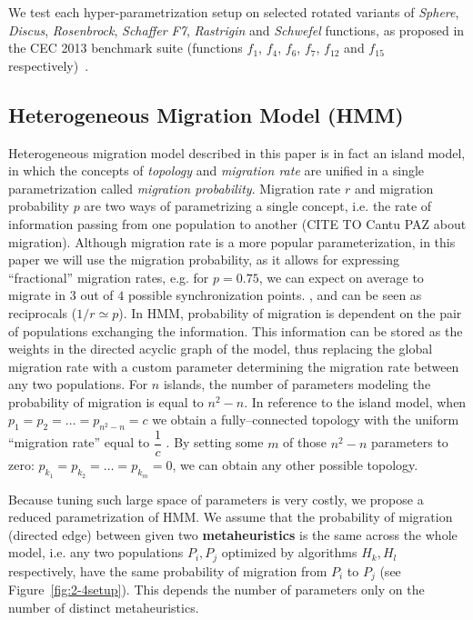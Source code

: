 \documentclass{sig-alternate}
\begin{document}
We test each hyper-parametrization setup on selected rotated variants of \emph{Sphere}, \emph{Discus}, \emph{Rosenbrock}, \emph{Schaffer F7}, \emph{Rastrigin} and \emph{Schwefel} functions, as proposed in the CEC 2013 benchmark suite (functions $f_1$, $f_4$, $f_6$, $f_7$, $f_{12}$ and $f_{15}$ respectively)~\cite{liang2013problem}.

\subsection{Heterogeneous Migration Model (HMM)}
Heterogeneous migration model described in this paper is in fact an island model, in which the concepts of \emph{topology} and \emph{migration rate} are unified in a single parametrization called \emph{migration probability}.
Migration rate $r$ and migration probability $p$ are two ways of parametrizing a single concept, i.e. the rate of information passing from one population to another (CITE TO Cantu PAZ about migration).
Although migration rate is a more popular parameterization, in this paper we will use the migration probability, as it allows for expressing ``fractional'' migration rates, e.g. for $p=0.75$, we can expect on average to migrate in $3$ out of $4$ possible synchronization points.
, and can be seen as reciprocals ($ 1/r \simeq p$).
In HMM, probability of migration is dependent on the pair of populations exchanging the information.
This information can be stored as the weights in the directed acyclic graph of the model, thus replacing the global migration rate with a custom parameter determining the migration rate between any two populations.
For $n$ islands, the number of parameters modeling the probability of migration is equal to $n^2 - n$.
In reference to the island model, when $p_1=p_2=\ldots=p_{n^2-n}=c$ we obtain a fully--connected topology with the uniform ``migration rate'' equal to $\dfrac{1}{c}$ .
By setting some $m$ of those $n^2-n$ parameters to zero: $p_{k_1} = p_{k_2} = \ldots = p_{k_m} = 0$, we can obtain any other possible topology.

Because tuning such large space of parameters is very costly, we propose a reduced parametrization of HMM.
We assume that the probability of migration (directed edge) between given two \textbf{metaheuristics} is the same across the whole model, i.e. any two populations $P_i, P_j$ optimized by algorithms $H_k, H_l$ respectively, have the same probability of migration from $P_i$ to $P_j$ (see Figure~\ref{fig:2-4setup}).
This depends the number of parameters only on the number of distinct metaheuristics.
\end{document}
